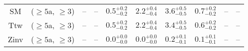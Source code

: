 \begin{table}[h!]
{\begin{tabular}{cccccccccc}
	SM & ($\ge5$a, $\ge3$) & -- & -- & $0.5^{+ 0.2 }_{- 0.2 }$ & $2.2^{+ 0.4 }_{- 0.4 }$ & $3.6^{+ 0.5 }_{- 0.5 }$ & $0.7^{+ 0.2 }_{- 0.2 }$ & -- & -- \\[0.5ex] 
	Ttw & ($\ge5$a, $\ge3$) & -- & -- & $0.5^{+ 0.2 }_{- 0.2 }$ & $2.2^{+ 0.4 }_{- 0.4 }$ & $3.4^{+ 0.5 }_{- 0.5 }$ & $0.6^{+ 0.2 }_{- 0.2 }$ & -- & -- \\[0.5ex] 
	Zinv & ($\ge5$a, $\ge3$) & -- & -- & $0.0^{+ 0.0 }_{- 0.0 }$ & $0.0^{+ 0.0 }_{- 0.0 }$ & $0.2^{+ 0.1 }_{- 0.1 }$ & $0.1^{+ 0.1 }_{- 0.1 }$ & -- & -- \\[0.5ex] 
	\hline
	\hline
\end{tabular}}
\end{table}
